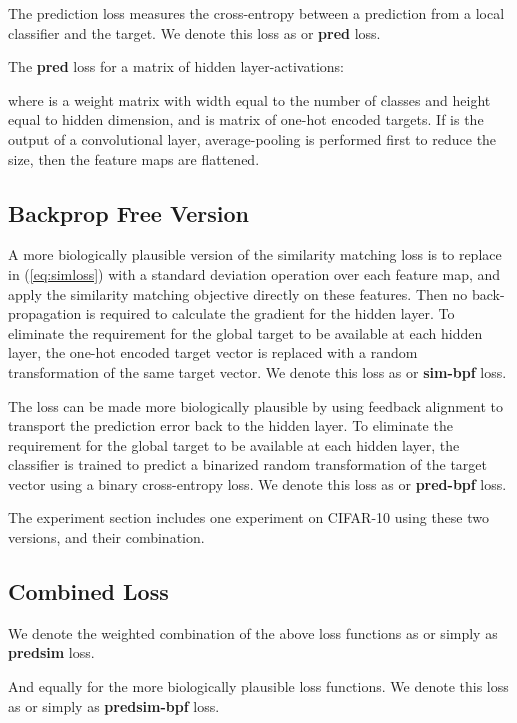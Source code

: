 \documentclass{article}
\begin{document}
The prediction loss measures the cross-entropy between a prediction from a local classifier and the target. We denote this loss as  or \textbf{pred} loss.

The \textbf{pred} loss for a matrix  of hidden layer-activations:
 
where  is a weight matrix with width equal to the number of classes and height equal to hidden dimension, and  is matrix of one-hot encoded targets. If  is the output of a convolutional layer, average-pooling is performed first to reduce the size, then the feature maps are flattened.

\subsection{Backprop Free Version}

A more biologically plausible version of the similarity matching loss is to replace  in (\ref{eq:simloss}) with a standard deviation operation over each feature map, and apply the similarity matching objective directly on these features. Then no back-propagation is required to calculate the gradient for the hidden layer. To eliminate the requirement for the global target to be available at each hidden layer, the one-hot encoded target vector is replaced with a random transformation of the same target vector.  We denote this loss as  or \textbf{sim-bpf} loss.

The  loss can be made more biologically plausible by using feedback alignment \cite{LillicrapCTA14} to transport the prediction error back to the hidden layer. To eliminate the requirement for the global target to be available at each hidden layer, the classifier is trained to predict a binarized random transformation of the target vector using a binary cross-entropy loss. We denote this loss as  or \textbf{pred-bpf} loss.

The experiment section includes one experiment on CIFAR-10 using these two versions, and their combination.

\subsection{Combined Loss}

We denote the weighted combination of the above loss functions as  or simply as \textbf{predsim} loss.


And equally for the more biologically plausible loss functions. We denote this loss as  or simply as \textbf{predsim-bpf} loss.
\end{document}
